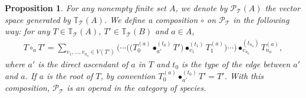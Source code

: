 \documentclass[11pt]{article}
\numberwithin{equation}{section}
\numberwithin{equation}{section}
\newtheorem{Proposition}[Theorem]{Proposition}
 { \theoremstyle{definition}
\newtheorem{Definition}[Theorem]{Definition}
\newtheorem{Note}[Theorem]{Note}
\newtheorem{Example}[Theorem]{Example}
\newtheorem{Remark}[Theorem]{Remark}
\newtheorem{Notation}[Theorem]{Notation}}
\newcommand{\T}{\mathcal{T}}
\newcommand{\bfT}{\mathbb{T}}
\renewcommand{\P}{\mathcal{P}}
\begin{document}
\begin{Proposition}
For any nonempty finite set $A$, we denote by $\P_\T(A)$ the vector space gene\-ra\-ted by $\bfT_\T(A)$.
We define a composition $\circ$ on $\P_\T$ in the following way: for any $T\in \bfT_\T(A)$,
$T'\in \bfT_\T(B)$ and $a\in A$,
\begin{gather*}
T\circ_a T'=\sum_{v_1,\dots,v_{n_a}\in V(T')}
\big(\cdots\big (\big(T_0^{(a)}\bullet_{a'}^{(t_0)} T'\big)\bullet_{v_1}^{(t_1)} T_1^{(a)}\big)\cdots\big)
\bullet_{v_{n_a}}^{(t_{n_a})} T_{n_a}^{(a)},\end{gather*}
where $a'$ is the direct ascendant of $a$ in $T$ and $t_0$ is the type of the edge between $a'$ and $a$.
If $a$ is the root of $T$, by convention $T_0^{(a)}\bullet_{a'}^{(t_0)} T'=T'$.
With this composition, $\P_\T$ is an operad in the category of species.
\end{Proposition}
\end{document}
